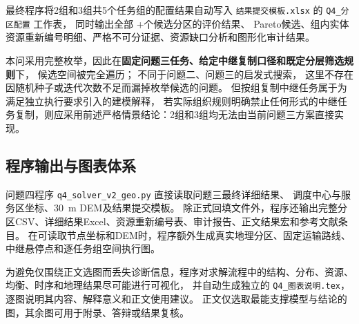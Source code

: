 最终程序将2组和3组共5个任务组的配置结果自动写入
\texttt{结果提交模板.xlsx} 的 \texttt{Q4\_分区配置} 工作表，
同时输出全部 \QFourKTwoPartitionNum+\QFourKThreePartitionNum 个候选分区的评价结果、
Pareto候选、组内实体资源重新编号明细、严格不可分证据、资源缺口分析和图形化审计结果。

本问采用完整枚举，因此在\textbf{固定问题三任务、给定中继复制口径和既定分层筛选规则}下，
候选空间被完全遍历；
不同于问题二、问题三的启发式搜索，
这里不存在因随机种子或迭代次数不足而漏掉枚举候选的问题。
但按组复制中继任务属于为满足独立执行要求引入的建模解释，
若实际组织规则明确禁止任何形式的中继任务复制，则应采用前述严格情景结论：2组和3组均无法由当前问题三方案直接实现。

\subsection{程序输出与图表体系}

问题四程序 \texttt{q4\_solver\_v2\_geo.py} 直接读取问题三最终详细结果、
调度中心与服务区坐标、30~m DEM及结果提交模板。
除正式回填文件外，程序还输出完整分区CSV、详细结果Excel、资源重新编号表、审计报告、正文结果宏和参考文献条目。
在可读取节点坐标和DEM时，程序额外生成真实地理分区、固定运输路线、中继悬停点和逐任务组空间执行图。

为避免仅围绕正文选图而丢失诊断信息，程序对求解流程中的结构、分布、资源、均衡、时序和地理结果尽可能进行可视化，
并自动生成独立的 \texttt{Q4\_图表说明.tex}，逐图说明其内容、解释意义和正文使用建议。
正文仅选取最能支撑模型与结论的图，其余图可用于附录、答辩或结果复核。
